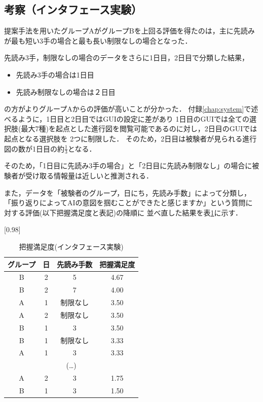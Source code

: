 \subsection{考察（インタフェース実験）}


提案手法を用いたグループAがグループBを上回る評価を得たのは，主に先読みが最も短い3手の場合と最も長い制限なしの場合となった．

先読み3手，制限なしの場合のデータをさらに1日目，2日目で分類した結果，
\begin{itemize}
    \item 先読み3手の場合は1日目
    \item 先読み制限なしの場合は２日目
\end{itemize}

の方がよりグループAからの評価が高いことが分かった．
付録\ref{chap:system}で述べるように，1日目と2日目ではGUIの設定に差があり
1日目のGUIでは全ての選択肢(最大7種)を起点とした進行図を閲覧可能であるのに対し，2日目のGUIでは起点となる選択肢を
2つに制限した．
そのため，2日目は被験者が見られる進行図の数が1日目の約$\frac{1}{3}$となる．

そのため，「1日目に先読み3手の場合」と「2日目に先読み制限なし」の場合に被験者が受け取る情報量は近しいと推測される．

また，データを「被験者のグループ，日にち，先読み手数」によって分類し，「振り返りによってAIの意図を掴むことができたと感じますか」という質問に対する評価(以下把握満足度と表記)の降順に
並べ直した結果を表\ref{table:order}に示す．
\begin{table}[H]
	\caption{把握満足度(インタフェース実験)}
    \label{table:order}
    \scriptsize
	\centering
	\scalebox{0.98}[0.98]{
		\begin{tabular}{c|c|c||c}
			グループ& 日 & 先読み手数 &把握満足度 \\ \hline
			B & 2 & 5 & 4.67\\
            B & 2 & 7 & 4.00\\
            A & 1 & 制限なし& 3.50\\
            A & 2 & 制限なし& 3.50\\
            B & 1 & 3& 3.50\\
            B & 1 & 制限なし& 3.33\\
            A & 1 & 3& 3.33\\
            \multicolumn{4}{c}{(\ldots)}\\
            A & 2 & 3 & 1.75\\
            B & 1 & 3 & 1.50\\

		\end{tabular}
	}
	
\end{table}

